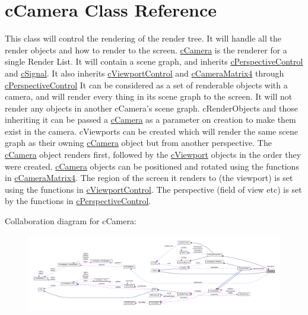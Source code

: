 \hypertarget{classc_camera}{
\section{cCamera Class Reference}
\label{classc_camera}
}


This class will control the rendering of the render tree. It will handle all the render objects and how to render to the screen. \hyperlink{classc_camera}{cCamera} is the renderer for a single Render List. It will contain a scene graph, and inherits \hyperlink{classc_perspective_control}{cPerspectiveControl} and \hyperlink{classc_signal}{cSignal}. It also inherits \hyperlink{classc_viewport_control}{cViewportControl} and \hyperlink{classc_camera_matrix4}{cCameraMatrix4} through \hyperlink{classc_perspective_control}{cPerspectiveControl} It can be considered as a set of renderable objects with a camera, and will render every thing in its scene graph to the screen. It will not render any objects in another cCamera's scene graph. cRenderObjects and those inheriting it can be passed a \hyperlink{classc_camera}{cCamera} as a parameter on creation to make them exist in the camera. cViewports can be created which will render the same scene graph as their owning \hyperlink{classc_camera}{cCamera} object but from another perspective. The \hyperlink{classc_camera}{cCamera} object renders first, followed by the \hyperlink{classc_viewport}{cViewport} objects in the order they were created. \hyperlink{classc_camera}{cCamera} objects can be positioned and rotated using the functions in \hyperlink{classc_camera_matrix4}{cCameraMatrix4}. The region of the screen it renders to (the viewport) is set using the functions in \hyperlink{classc_viewport_control}{cViewportControl}. The perspective (field of view etc) is set by the functions in \hyperlink{classc_perspective_control}{cPerspectiveControl}.  




Collaboration diagram for cCamera:\nopagebreak
\begin{figure}[H]
\begin{center}
\leavevmode
\includegraphics[width=400pt]{classc_camera__coll__graph}
\end{center}
\end{figure}
